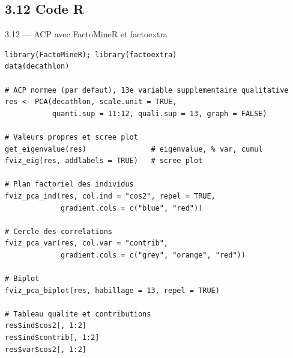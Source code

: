 \subsection{3.12 Code R}
\begin{frame}[fragile]{3.12 — ACP avec FactoMineR et factoextra}
\begin{lstlisting}
library(FactoMineR); library(factoextra)
data(decathlon)

# ACP normee (par defaut), 13e variable supplementaire qualitative
res <- PCA(decathlon, scale.unit = TRUE,
           quanti.sup = 11:12, quali.sup = 13, graph = FALSE)

# Valeurs propres et scree plot
get_eigenvalue(res)               # eigenvalue, % var, cumul
fviz_eig(res, addlabels = TRUE)   # scree plot

# Plan factoriel des individus
fviz_pca_ind(res, col.ind = "cos2", repel = TRUE,
             gradient.cols = c("blue", "red"))

# Cercle des correlations
fviz_pca_var(res, col.var = "contrib",
             gradient.cols = c("grey", "orange", "red"))

# Biplot
fviz_pca_biplot(res, habillage = 13, repel = TRUE)

# Tableau qualite et contributions
res$ind$cos2[, 1:2]
res$ind$contrib[, 1:2]
res$var$cos2[, 1:2]
\end{lstlisting}
\end{frame}

